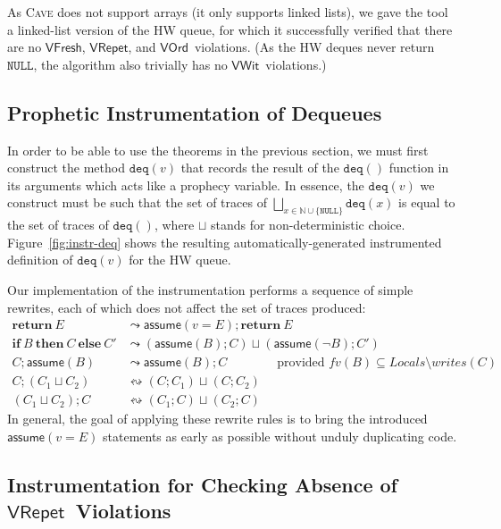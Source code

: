 \documentclass{LMCS}
\newcommand{\NULL}{\ensuremath{\mathtt{NULL}}}
\newcommand{\deq}{\ensuremath{\mathtt{deq}}}
\newcommand{\assume}{\mathsf{assume}}
\newcommand{\ndchoice}{\sqcup}
\newcommand{\bigndchoice}{\bigsqcup}
\newcommand{\VFresh}{\ensuremath{\mathsf{VFresh}}}
\newcommand{\VRepet}{\ensuremath{\mathsf{VRepet}}}
\newcommand{\VOrd}{\ensuremath{\mathsf{VOrd}}}
\newcommand{\VWit}{\ensuremath{\mathsf{VWit}}}
\begin{document}
As \textsc{Cave} does not support arrays (it only supports linked lists), we
gave the tool a linked-list version of the HW queue, for which it successfully 
verified that there are no \VFresh, \VRepet, and \VOrd\ violations.
(As the HW deques never return $\NULL$, the algorithm also trivially has no
\VWit\ violations.) 


\subsection*{Prophetic Instrumentation of Dequeues}

In order to be able to use the theorems in the previous section, we must first
construct the method $\deq(v)$ that records the result of the $\deq()$ function
in its arguments which acts like a prophecy variable.
In essence, the $\deq(v)$ we construct must be such that the set of traces of
$\bigndchoice_{x \in \mathbb{N}\cup\{\NULL\}} \deq(x)$ 
is equal to the set of traces of $\deq()$, where $\ndchoice$ stands for
non-deterministic choice.
Figure~\ref{fig:instr-deq} shows the resulting automatically-generated 
instrumented definition of $\deq(v)$ for the HW queue.

Our implementation of the instrumentation performs a sequence of simple rewrites,
each of which does not affect the set of traces produced:
\begin{align*}
\mathbf{return }\ E &\leadsto  \assume(v = E); \mathbf{return}\ E \\
\mathbf{if}\ B\ \mathbf{then}\ C\ \mathbf{else}\ C' 
                &\leadsto  (\assume(B); C) \ndchoice (\assume(\lnot B); C')  \\
C ; \assume(B)  &\leadsto  \assume(B); C    
                \qquad\qquad\text{provided } \mathit{fv}(B) \subseteq \mathit{Locals} \setminus \mathit{writes}(C) \\
C ; (C_1 \ndchoice C_2)  &\leftrightsquigarrow   (C ; C_1) \ndchoice (C; C_2) \\
(C_1 \ndchoice C_2) ; C  &\leftrightsquigarrow   (C_1; C) \ndchoice (C_2; C) 
\end{align*}
In general, the goal of applying these rewrite rules is to bring the introduced
$\assume(v = E)$ statements as early as possible without unduly duplicating
code.

\subsection*{Instrumentation for Checking Absence of \VRepet\ Violations}
\end{document}
